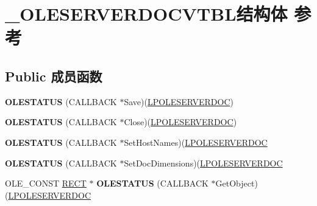 \hypertarget{struct___o_l_e_s_e_r_v_e_r_d_o_c_v_t_b_l}{}\section{\+\_\+\+O\+L\+E\+S\+E\+R\+V\+E\+R\+D\+O\+C\+V\+T\+B\+L结构体 参考}
\label{struct___o_l_e_s_e_r_v_e_r_d_o_c_v_t_b_l}
\subsection*{Public 成员函数}
\begin{DoxyCompactItemize}
\item 
\mbox{\label{struct___o_l_e_s_e_r_v_e_r_d_o_c_v_t_b_l_ac4b8480ce32f111ba124043cd41bb969}} 
{\bfseries O\+L\+E\+S\+T\+A\+T\+US} (C\+A\+L\+L\+B\+A\+CK $\ast$Save)(\hyperlink{struct___o_l_e_s_e_r_v_e_r_d_o_c}{L\+P\+O\+L\+E\+S\+E\+R\+V\+E\+R\+D\+OC})
\item 
\mbox{\label{struct___o_l_e_s_e_r_v_e_r_d_o_c_v_t_b_l_ad8699da6346c478970c1e490fe6ecb82}} 
{\bfseries O\+L\+E\+S\+T\+A\+T\+US} (C\+A\+L\+L\+B\+A\+CK $\ast$Close)(\hyperlink{struct___o_l_e_s_e_r_v_e_r_d_o_c}{L\+P\+O\+L\+E\+S\+E\+R\+V\+E\+R\+D\+OC})
\item 
\mbox{\label{struct___o_l_e_s_e_r_v_e_r_d_o_c_v_t_b_l_aab3bed74d4dc7d838b8209be22fa410f}} 
{\bfseries O\+L\+E\+S\+T\+A\+T\+US} (C\+A\+L\+L\+B\+A\+CK $\ast$Set\+Host\+Names)(\hyperlink{struct___o_l_e_s_e_r_v_e_r_d_o_c}{L\+P\+O\+L\+E\+S\+E\+R\+V\+E\+R\+D\+OC}
\item 
\mbox{\label{struct___o_l_e_s_e_r_v_e_r_d_o_c_v_t_b_l_a4e73383df6f5b63299f592f321027fd7}} 
{\bfseries O\+L\+E\+S\+T\+A\+T\+US} (C\+A\+L\+L\+B\+A\+CK $\ast$Set\+Doc\+Dimensions)(\hyperlink{struct___o_l_e_s_e_r_v_e_r_d_o_c}{L\+P\+O\+L\+E\+S\+E\+R\+V\+E\+R\+D\+OC}
\item 
\mbox{\label{struct___o_l_e_s_e_r_v_e_r_d_o_c_v_t_b_l_a6a1b8acfa1e5784ededb0116b6b045ed}} 
O\+L\+E\+\_\+\+C\+O\+N\+ST \hyperlink{structtag_r_e_c_t}{R\+E\+CT} $\ast$ {\bfseries O\+L\+E\+S\+T\+A\+T\+US} (C\+A\+L\+L\+B\+A\+CK $\ast$Get\+Object)(\hyperlink{struct___o_l_e_s_e_r_v_e_r_d_o_c}{L\+P\+O\+L\+E\+S\+E\+R\+V\+E\+R\+D\+OC}

\end{DoxyCompactItemize}
